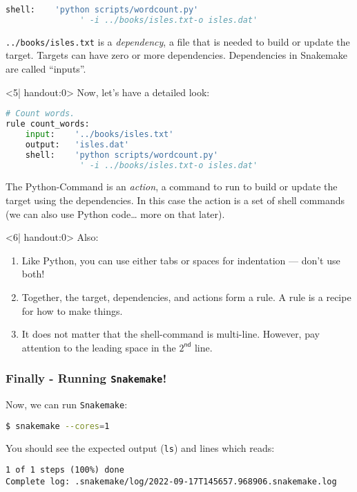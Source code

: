 \begin{frame}[fragile]
\begin{onlyenv}
\begin{lstlisting}[language=Python,style=Python]
    shell:    'python scripts/wordcount.py' 
               ' -i ../books/isles.txt-o isles.dat'
    \end{lstlisting}
    \texttt{../books/isles.txt} is a \emph{dependency}, a file that is needed to build or update the target. Targets can have zero or more dependencies. Dependencies in Snakemake are called “inputs”.
  \end{onlyenv}
  \begin{onlyenv}<5| handout:0>
   Now, let's have a detailed look:
   \begin{lstlisting}[language=Python,style=Python]
# Count words.
rule count_words:
    input:    '../books/isles.txt'
    output:   'isles.dat'
    shell:    'python scripts/wordcount.py' 
               ' -i ../books/isles.txt-o isles.dat'
    \end{lstlisting}
    The Python-Command is an \emph{action}, a command to run to build or update the target using the dependencies. In this case the action is a set of shell commands (we can also use Python code… more on that later).
  \end{onlyenv}
  \begin{onlyenv}<6| handout:0>
  Also:
  \begin{enumerate}
   \item Like Python, you can use either tabs or spaces for indentation — don’t use both!
   \item Together, the target, dependencies, and actions form a rule. A rule is a recipe for how to make things.
   \item It does not matter that the shell-command is multi-line. However, pay attention to the leading space in the $2^\mathsf{nd}$ line.
  \end{enumerate}
  \end{onlyenv}
\end{frame}

\begin{frame}[fragile]
  \frametitle{Finally - Running \texttt{Snakemake}!}
  Now, we can run \texttt{Snakemake}:
  \begin{lstlisting}[language=Bash, style=Shell]
$ snakemake --cores=1
  \end{lstlisting}
  You should see the expected output (\texttt{ls}) and lines which reads:
  \begin{lstlisting}[style=Plain, basicstyle=\footnotesize]
1 of 1 steps (100%) done
Complete log: .snakemake/log/2022-09-17T145657.968906.snakemake.log
  \end{lstlisting}
\end{frame}

